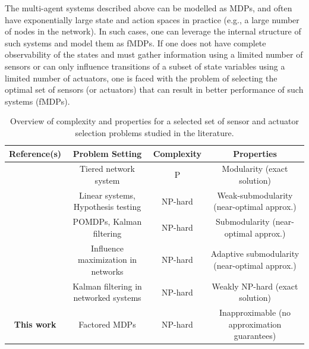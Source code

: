 \documentclass[twocolumn]{autart}    %
\begin{document}
 The multi-agent systems described above can be modelled as MDPs, and often have exponentially large state and action spaces in practice (e.g., a large number of nodes in the network). In such cases, one can leverage the internal structure of such systems and model them as fMDPs. If one does not have complete observability of the states and must gather information using a limited number of sensors or can only influence transitions of a subset of state variables using a limited number of actuators, one is faced with the problem of selecting the optimal set of sensors (or actuators) that can result in better performance of such systems (fMDPs). 


\begin{table}[!ht]
  \centering
  \small
 \begin{tabular}{cccc}
  \hline
  \textbf{Reference(s)} & \textbf{Problem Setting}  & \textbf{Complexity} & \textbf{Properties} \\
  \hline
    \cite{bian2006utility}& Tiered network system & P & Modularity (exact solution)  \\
    \cite{hashemi2020randomized,bhargav24a} & Linear systems, Hypothesis testing  & NP-hard & Weak-submodularity (near-optimal approx.)  \\
    \cite{ghasemi2019perception,tzoumas2015minimal}& POMDPs, Kalman filtering  &NP-hard & Submodularity (near-optimal approx.) \\
    \cite{golovin2011adaptive}& Influence maximization in networks & NP-hard & Adaptive submodularity (near-optimal approx.)\\
    \cite{ye2020resilient}& Kalman filtering in networked systems & NP-hard & Weakly NP-hard (exact solution) \\
    \textbf{This work}& Factored MDPs & NP-hard & Inapproximable (no approximation guarantees)\\
    \hline
  \end{tabular}
  \caption{Overview of complexity and properties for a selected set of sensor and actuator selection problems studied in the literature.}
  \label{tab:1}
\end{table}
\end{document}
